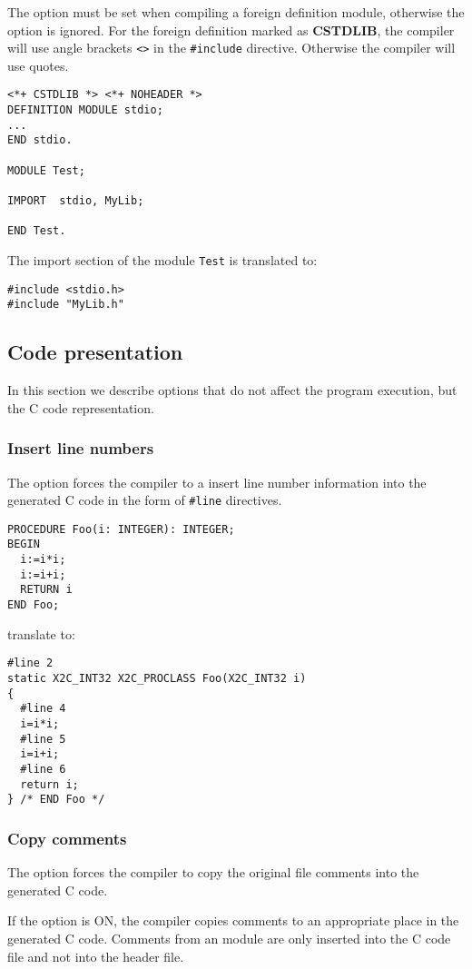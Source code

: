 The 
option must be set when compiling a foreign definition
module, otherwise the option is ignored.
For the foreign definition marked as {\bf CSTDLIB},
the compiler will use angle brackets \verb+<>+
in the \verb|#include| directive.
Otherwise the compiler will use quotes.
\Example
\begin{verbatim}
<*+ CSTDLIB *> <*+ NOHEADER *>
DEFINITION MODULE stdio;
...
END stdio.

MODULE Test;

IMPORT  stdio, MyLib;

END Test.
\end{verbatim}
The import section of the module {\tt Test} is translated to:
\begin{verbatim}
#include <stdio.h>
#include "MyLib.h"
\end{verbatim}

\subsection{Code presentation}\label{maptoc:opt:rep}

In  this  section  we  describe options that do not affect the
program execution, but the C code representation.

\subsubsection{Insert line numbers}

The  option forces the
compiler  to a insert line number information into the generated C
code in the form of \verb+#line+ directives.
\Example
\begin{verbatim}
PROCEDURE Foo(i: INTEGER): INTEGER;
BEGIN
  i:=i*i;
  i:=i+i;
  RETURN i
END Foo;
\end{verbatim}
translate to:
\begin{verbatim}
#line 2
static X2C_INT32 X2C_PROCLASS Foo(X2C_INT32 i)
{
  #line 4
  i=i*i;
  #line 5
  i=i+i;
  #line 6
  return i;
} /* END Foo */
\end{verbatim}

\subsubsection{Copy comments}

The  option forces the
compiler  to copy the original file comments into the generated C
code.

If the option is ON, the compiler copies comments to an appropriate
place in the  generated  C  code.  Comments from an \ot{} module are
only inserted into the C code file and not into the header file.


